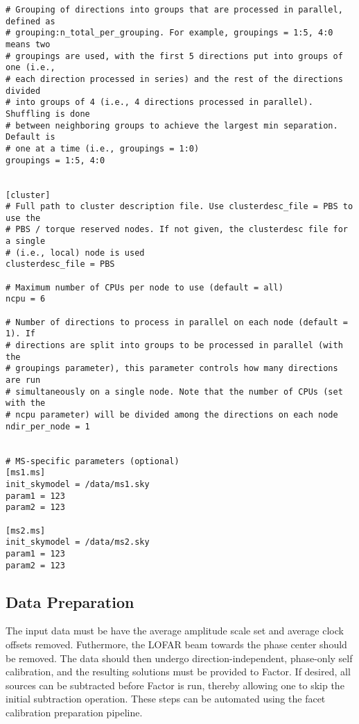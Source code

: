 \documentclass[structabstract]{article}
\begin{document}
\begin{verbatim}
# Grouping of directions into groups that are processed in parallel, defined as
# grouping:n_total_per_grouping. For example, groupings = 1:5, 4:0 means two
# groupings are used, with the first 5 directions put into groups of one (i.e.,
# each direction processed in series) and the rest of the directions divided
# into groups of 4 (i.e., 4 directions processed in parallel). Shuffling is done
# between neighboring groups to achieve the largest min separation. Default is
# one at a time (i.e., groupings = 1:0)
groupings = 1:5, 4:0


[cluster]
# Full path to cluster description file. Use clusterdesc_file = PBS to use the
# PBS / torque reserved nodes. If not given, the clusterdesc file for a single
# (i.e., local) node is used
clusterdesc_file = PBS

# Maximum number of CPUs per node to use (default = all)
ncpu = 6

# Number of directions to process in parallel on each node (default = 1). If
# directions are split into groups to be processed in parallel (with the
# groupings parameter), this parameter controls how many directions are run
# simultaneously on a single node. Note that the number of CPUs (set with the
# ncpu parameter) will be divided among the directions on each node
ndir_per_node = 1


# MS-specific parameters (optional)
[ms1.ms]
init_skymodel = /data/ms1.sky
param1 = 123
param2 = 123

[ms2.ms]
init_skymodel = /data/ms2.sky
param1 = 123
param2 = 123
\end{verbatim}


\subsection{Data Preparation}
\label{factor:data}

The input data must be have the average amplitude scale set and average clock
offsets removed. Futhermore, the LOFAR beam towards the phase center should be
removed. The data should then undergo direction-independent, phase-only self
calibration, and the resulting solutions must be provided to Factor. If desired,
all sources can be subtracted before Factor is run, thereby allowing one to skip
the initial subtraction operation. These steps can be automated using the facet
calibration preparation pipeline.

\end{document}
